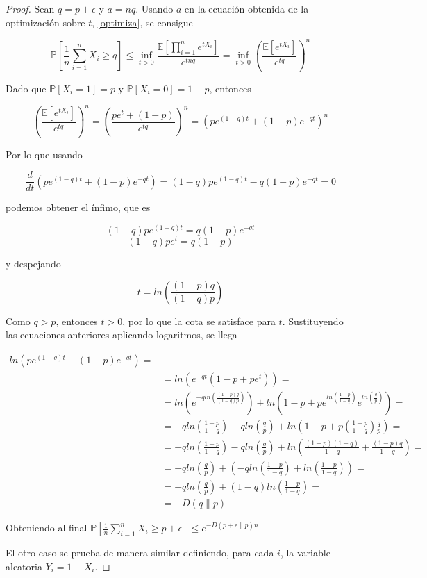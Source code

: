 \begin{proof}
Sean $q=p+\epsilon$ y $a=nq$. Usando $a$ en la ecuación obtenida de la optimización sobre $t$, \ref{optimiza}, se consigue

$$\mathbb{P} \left[ \frac{1}{n} \sum_{i=1}^n X_i \geq q \right] \leq \inf_{t>0} \frac{\mathbb{E}[\prod_{i=1}^n e^{tX_i}]}{e^{tnq}} = \inf_{t>0} \left( \frac{\mathbb{E}[e^{tX_i}]}{e^{tq}} \right)^n$$

Dado que $\mathbb{P}[X_i=1]=p$ y $\mathbb{P}[X_i=0]=1-p$, entonces

$$\left( \frac{\mathbb{E}[e^{tX_i}]}{e^{tq}} \right)^n = \left( \frac{pe^{t} + (1-p)}{e^{tq}} \right)^n = \left( pe^{(1-q)t} + (1-p) e^{-qt} \right)^n$$

Por lo que usando

$$\frac{d}{dt} \left( pe^{(1-q)t} + (1-p)e^{-qt} \right) = (1-q)pe^{(1-q)t} - q(1-p)e^{-qt} = 0$$

podemos obtener el ínfimo, que es

$$(1-q)pe^{(1-q)t} = q(1-p)e^{-qt}$$
$$(1-q)pe^t = q(1-p)$$

y despejando

$$t = ln \left( \frac{(1-p)q}{(1-q)p} \right)$$

Como $q>p$, entonces $t>0$, por lo que la cota se satisface para $t$. Sustituyendo las ecuaciones anteriores aplicando logaritmos, se llega

\begin{align*}
ln \left( pe^{(1-q)t} + (1-p)e^{-qt} \right) = \\
&=ln \left( e^{-qt} (1-p+pe^t) \right) = \\
&=ln \left( e^{-q ln \left( \frac{(1-p)q}{(1-q)p} \right)} \right) + ln \left( 1-p+pe^{ln \left( \frac{1-p}{1-q} \right)}e^{ln \left( \frac{q}{p} \right)} \right) = \\
&=-q ln \left( \frac{1-p}{1-q} \right) -q ln \left( \frac{q}{p} \right)+ln \left( 1-p+p \left( \frac{1-p}{1-q} \right) \frac{q}{p} \right) = \\
&= -q ln \left( \frac{1-p}{1-q} \right) -q ln \left( \frac{q}{p} \right) + ln \left(  \frac{(1-p)(1-q)}{1-q} + \frac{(1-p)q}{1-q} \right) = \\
&= -q ln \left( \frac{q}{p} \right) + \left( -q ln \left( \frac{1-p}{1-q} \right) + ln \left( \frac{1-p}{1-q} \right) \right) = \\
&= -q ln \left( \frac{q}{p} \right) + (1-q) ln \left( \frac{1-p}{1-q} \right) = \\
&= -D(q \| p)
\end{align*}

Obteniendo al final $\mathbb{P} \left[ \frac{1}{n} \sum_{i=1}^n X_i \geq p+\epsilon \right] \leq e^{-D (p+\epsilon  \| p)n}$

El otro caso se prueba de manera similar definiendo, para cada $i$, la variable aleatoria $Y_i = 1-X_i$.

\end{proof}

